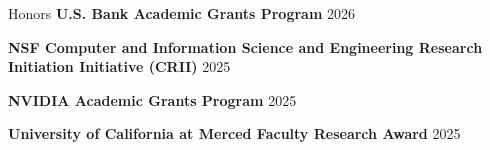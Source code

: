 \begin{rSection}{Honors}
{\bf U.S. Bank Academic Grants Program} \hfill {2026}

{\bf NSF Computer and Information Science and Engineering Research Initiation Initiative (CRII)} \hfill {2025}

{\bf NVIDIA Academic Grants Program} \hfill {2025}

{\bf University of California at Merced Faculty Research Award} \hfill {2025}

\end{rSection}

